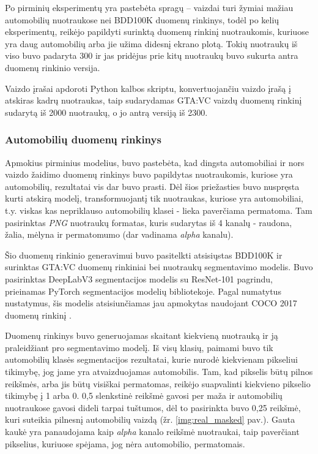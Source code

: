\documentclass{VUMIFPSbakalaurinis}
\begin{document}
            Po pirminių eksperimentų yra pastebėta spragų – vaizdai turi žymiai mažiau automobilių nuotraukose nei BDD100K duomenų rinkinys, todėl po kelių eksperimentų, reikėjo papildyti surinktą duomenų rinkinį nuotraukomis, kuriuose yra daug automobilių arba jie užima didesnį ekrano plotą. Tokių nuotraukų iš viso buvo padaryta 300 ir jas pridėjus prie kitų nuotraukų buvo sukurta antra duomenų rinkinio versija.

            Vaizdo įrašai apdoroti Python kalbos skriptu, konvertuojančiu vaizdo įrašą į atskiras kadrų nuotraukas, taip sudarydamas GTA:VC vaizdų duomenų rinkinį sudarytą iš 2000 nuotraukų, o jo antrą versiją iš 2300.
        
        \subsubsection{Automobilių duomenų rinkinys}
            Apmokius pirminius modelius, buvo pastebėta, kad dingsta automobiliai ir nors vaizdo žaidimo duomenų rinkinys buvo papildytas nuotraukomis, kuriose yra automobilių, rezultatai vis dar buvo prasti. Dėl šios priežasties buvo nuspręsta kurti atskirą modelį, transformuojantį tik nuotraukas, kuriose yra automobiliai, t.y. viskas kas nepriklauso automobilių klasei - lieka paverčiama permatoma. Tam pasirinktas \emph{PNG} nuotraukų formatas, kuris sudarytas iš 4 kanalų - raudona, žalia, mėlyna ir permatomumo (dar vadinama \emph{alpha} kanalu).

            Šio duomenų rinkinio generavimui buvo pasitelkti atsisiųstas BDD100K ir surinktas GTA:VC duomenų rinkiniai bei nuotraukų segmentavimo modelis. Buvo pasirinktas DeepLabV3 segmentacijos modelis su ResNet-101 pagrindu, prieinamas PyTorch segmentacijos modelių bibliotekoje. Pagal numatytus nustatymus, šis modelis atsisiunčiamas jau apmokytas naudojant COCO 2017 duomenų rinkinį \cite{CocoDataset}.

            Duomenų rinkinys buvo generuojamas skaitant kiekvieną nuotrauką ir ją praleidžiant pro segmentavimo modelį. Iš visų klasių, paimami buvo tik automobilių klasės segmentacijos rezultatai, kurie nurodė kiekvienam pikseliui tikimybę, jog jame yra atvaizduojamas automobilis. Tam, kad pikselis būtų pilnos reikšmės, arba jis būtų visiškai permatomas, reikėjo suapvalinti kiekvieno pikselio tikimybę į 1 arba 0. 0,5 slenkstinė reikšmė gavosi per maža ir automobilių nuotraukose gavosi dideli tarpai tuštumos, dėl to pasirinkta buvo 0,25 reikšmė, kuri suteikia pilnesnį automobilių vaizdą (žr. \ref{img:real_masked} pav.). Gauta kaukė yra panaudojama kaip \emph{alpha} kanalo reikšmė nuotraukai, taip paverčiant pikselius, kuriuose spėjama, jog nėra automobilio, permatomais.
\end{document}

